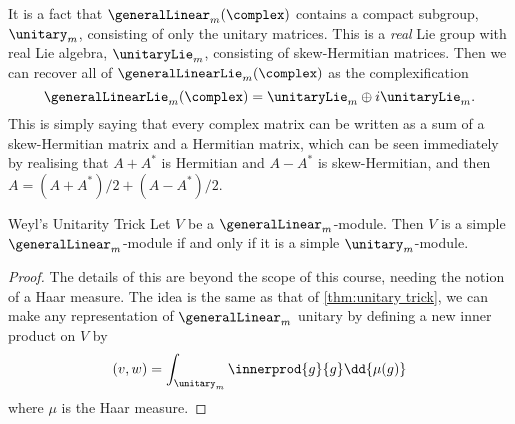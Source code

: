 \documentclass[fleqn]{NotesClass}
\begin{document}
    It is a fact that \(\generalLinear_m(\complex)\) contains a compact subgroup, \(\unitary_m\), consisting of only the unitary matrices.
    This is a \emph{real} Lie group with real Lie algebra, \(\unitaryLie_m\), consisting of skew-Hermitian matrices.
    Then we can recover all of \(\generalLinearLie_m(\complex)\) as the complexification
    \begin{equation}
        \generalLinearLie_m(\complex) = \unitaryLie_m \oplus i \unitaryLie_m.
    \end{equation}
    This is simply saying that every complex matrix can be written as a sum of a skew-Hermitian matrix and a Hermitian matrix, which can be seen immediately by realising that \(A + A^*\) is Hermitian and \(A - A^*\) is skew-Hermitian, and then \(A = (A + A^*)/2 + (A - A^*)/2\).
    
    \begin{prp}{Weyl's Unitarity Trick}{}
        Let \(V\) be a \(\generalLinear_m\)-module.
        Then \(V\) is a simple \(\generalLinear_m\)-module if and only if it is a simple \(\unitary_m\)-module.
        \begin{proof}
            The details of this are beyond the scope of this course, needing the notion of a Haar measure.
            The idea is the same as that of \cref{thm:unitary trick}, we can make any representation of \(\generalLinear_m\) unitary by defining a new inner product on \(V\) by
            \begin{equation}
                (v, w) = \int_{\unitary_m} \innerprod{g}{g} \dd{\mu(g)}
            \end{equation}
            where \(\mu\) is the Haar measure.
        \end{proof}
    \end{prp}
    
    
    
	\appendixpage
	\begin{appendices}
	    
	\end{appendices}

    \backmatter
    \renewcommand{\glossaryname}{Acronyms}
    \printglossary[acronym]
    \printindex
\end{document}
